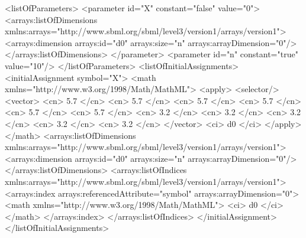 \begin{example}
    
<listOfParameters>
    <parameter id="X" constant="false" value="0">
        <arrays:listOfDimensions
            xmlns:arrays="http://www.sbml.org/sbml/level3/version1/arrays/version1">
            <arrays:dimension arrays:id="d0" arrays:size="n" arrays:arrayDimension="0"/>
        </arrays:listOfDimensions>
    </parameter>
    <parameter id="n" constant="true" value="10"/>
</listOfParameters>
<listOfInitialAssignments>
    <initialAssignment symbol="X">
        <math xmlns="http://www.w3.org/1998/Math/MathML">
            <apply>
              <selector/>
              <vector>
                  <cn> 5.7 </cn>
                  <cn> 5.7 </cn>
                  <cn> 5.7 </cn>
                  <cn> 5.7 </cn>
                  <cn> 5.7 </cn>
                  <cn> 5.7 </cn>
                  <cn> 3.2 </cn>
                  <cn> 3.2 </cn>
                  <cn> 3.2 </cn>
                  <cn> 3.2 </cn>
                  <cn> 3.2 </cn>
              </vector>
              <ci> d0 </ci>
            </apply>
        </math>
        <arrays:listOfDimensions
            xmlns:arrays="http://www.sbml.org/sbml/level3/version1/arrays/version1">
            <arrays:dimension arrays:id="d0" arrays:size="n" arrays:arrayDimension="0"/>
        </arrays:listOfDimensions>
        <arrays:listOfIndices
            xmlns:arrays="http://www.sbml.org/sbml/level3/version1/arrays/version1">
            <arrays:index arrays:referencedAttribute="symbol" arrays:arrayDimension="0">
                <math xmlns="http://www.w3.org/1998/Math/MathML">
                    <ci> d0 </ci>
                </math>
            </arrays:index>
        </arrays:listOfIndices>
    </initialAssignment>
</listOfInitialAssignments>
\end{example}



